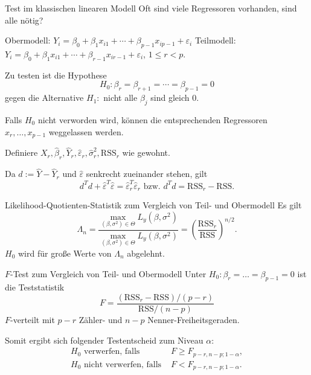 \begin{karte}{Test im klassischen linearen Modell}
Oft sind viele Regressoren vorhanden, sind alle nötig?

Obermodell: \(Y_i = \beta_0 + \beta_1 x_{i1} + \cdots + \beta_{p-1} x_{i p-1} + \varepsilon_i\)
Teilmodell: \(Y_i = \beta_0 + \beta_1 x_{i1} + \cdots + \beta_{r-1} x_{i r-1} + \varepsilon_i\), \(1 \leq r < p\).

Zu testen ist die Hypothese 
\[ H_0: \beta_r = \beta_{r+1} = \cdots = \beta_{p-1} = 0 \] 
gegen die Alternative \(H_1: \) nicht alle \(\beta_j\) sind gleich \(0\).

Falls \(H_0\) nicht verworden wird, können die entsprechenden Regressoren \(x_r, \ldots, x_{p-1}\) weggelassen werden.

Definiere \(X_r, \hat{\beta}_r, \hat{Y}_r, \hat{\varepsilon}_r, \hat{\sigma}_r^2, \mathrm{RSS}_r\) wie gewohnt. 

Da \(d := \hat{Y} - \hat{Y}_r\) und \(\hat{\varepsilon}\) senkrecht zueinander stehen, gilt 
\[ d^T d + \hat{\varepsilon}^T \hat{\varepsilon} = \hat{\varepsilon}_r^T \hat{\varepsilon}_r \text{ bzw. } d^T d = \mathrm{RSS}_r - \mathrm{RSS}. \]
\end{karte}

\begin{karte}{Likelihood-Quotienten-Statistik zum Vergleich von Teil- und Obermodell}
Es gilt 
\[ \Lambda_n = \frac{\max_{(\beta, \sigma^2) \in \Theta} L_y(\beta, \sigma^2)}{\max_{(\beta, \sigma^2) \in \Theta} L_y(\beta, \sigma^2)} 
= \left(  \frac{\mathrm{RSS}_r}{\mathrm{RSS}}  \right)^{n/2}. \]
\(H_0\) wird für große Werte von \(\Lambda_n\) abgelehnt.
\end{karte}

\begin{karte}{\(F\)-Test zum Vergleich von Teil- und Obermodell}
Unter \(H_0: \beta_r = \ldots = \beta_{p-1} = 0\) ist die Teststatistik 
\[ F = \frac{(\mathrm{RSS}_r - \mathrm{RSS}) / (p-r)}{ \mathrm{RSS} / (n-p) } \]
\(F\)-verteilt mit \(p-r\) Zähler- und \(n-p\) Nenner-Freiheitsgeraden.

Somit ergibt sich folgender Testentscheid zum Niveau \(\alpha\):
\begin{align*}
    H_0 \text{ verwerfen, falls } & F \geq F_{p-r, n-p; 1-\alpha}, \\
    H_0 \text{ nicht verwerfen, falls } & F < F_{p-r, n-p; 1-\alpha}.
\end{align*}
\end{karte}

